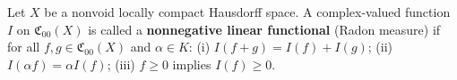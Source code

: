 Let $X$ be a nonvoid locally compact Hausdorff space. A complex-valued function $I$ on $\mathfrak{C}_{00}(X)$ is called a \textbf{nonnegative linear functional} (Radon measure) if for all $f, g \in \mathfrak{C}_{00}(X)$ and $\alpha \in K$: (i) $I(f+g) = I(f) + I(g)$; (ii) $I(\alpha f) = \alpha I(f)$; (iii) $f \geq 0$ implies $I(f) \geq 0$.
